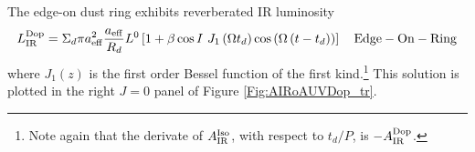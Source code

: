 The edge-on dust ring exhibits reverberated IR luminosity
\begin{equation}
L^{\rm{Dop}}_{\rm{IR}} =  \Sigma_d \pi  a^2_{\rm{eff}}  \frac{ a_{\rm{eff}} }{ R_d } L^0   \left[ 1 +  \beta \cos{I}  \ J_1\left( \Omega t_d \right)  \cos{ \left( \Omega \left( t - t_d \right) \right)  } 
   \right] \quad \rm{Edge-On-Ring}
   \label{Eq:DOP_Ring}
\end{equation}
where $J_1(z)$ is the first order Bessel function of the first
kind.\footnote{Note again that the derivate of $A^{\rm{Iso}}_{\rm{IR}}$, with
respect to $t_d/P$, is $-A^{\rm{Dop}}_{\rm{IR}}$.} This solution is plotted in
the right $J=0$ panel of Figure \ref{Fig:AIRoAUVDop_tr}.





